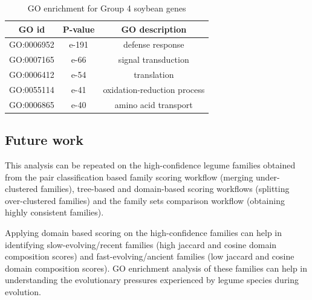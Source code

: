 \documentclass{article}
\begin{document}
		\begin{table}[h!]
			\centering
			\begin{tabular}{|c |c |c |} 
				\hline
				GO id & P-value & GO description \\
				\hline\hline
				GO:0006952 & e-191 & defense response \\ 
				\hline
				GO:0007165 & e-66 & signal transduction \\
				\hline
				GO:0006412 & e-54 & translation \\
				\hline
				GO:0055114 & e-41 & oxidation-reduction process \\
				\hline
				GO:0006865 & e-40 & amino acid transport \\ 
				\hline
			\end{tabular}
			\caption{GO enrichment for Group 4 soybean genes}
			\label{tab:gotable_group4}
		\end{table}
		
		\subsection{Future work}
		This analysis can be repeated on the high-confidence legume families obtained from the pair classification based family scoring workflow (merging under-clustered families), tree-based and domain-based scoring workflows (splitting over-clustered families) and the family sets comparison workflow (obtaining highly consistent families). 
		
		Applying domain based scoring on the high-confidence families can help in identifying slow-evolving/recent families (high jaccard and cosine domain composition scores) and fast-evolving/ancient families (low jaccard and cosine domain composition scores). GO enrichment analysis of these families can help in understanding the evolutionary pressures experienced by legume species during evolution. 
		
	
\end{document}
